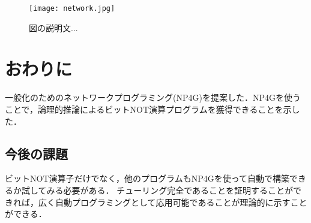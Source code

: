 \documentclass[exploratorypaper]{jsaiart} %
\begin{document}
\begin{figure*}[t]
    \begin{center}
        \texttt{[image: network.jpg]}
    \end{center}
    \capwidth=90mm %
    \caption{図の説明文... }
    \label{fig:net}
\end{figure*}

\section{おわりに}
一般化のためのネットワークプログラミング(NP4G)を提案した．NP4Gを使うことで，論理的推論によるビットNOT演算プログラムを獲得できることを示した．

\subsection{今後の課題}
ビットNOT演算子だけでなく，他のプログラムもNP4Gを使って自動で構築できるか試してみる必要がある．
チューリング完全であることを証明することができれば，広く自動プログラミングとして応用可能であることが理論的に示すことができる．





\begin{biography}
\end{biography}
\end{document}

